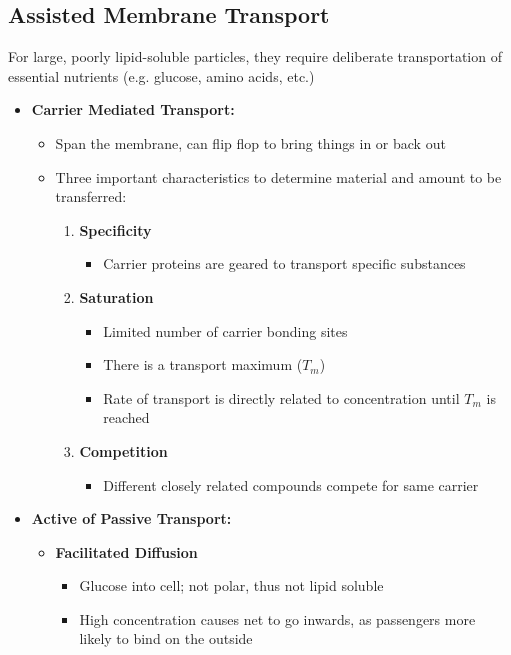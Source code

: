 \documentclass[11pt]{article}
\begin{document}
\subsection{Assisted Membrane Transport}
For large, poorly lipid-soluble particles, they require deliberate transportation of essential nutrients (e.g. glucose, amino acids, etc.)
\begin{itemize}

\item \textbf{Carrier Mediated Transport:}
\begin{itemize}
\item Span the membrane, can flip flop to bring things in or back out 
\item Three important characteristics to determine material and amount to be transferred:
\begin{enumerate}
\item \textbf{Specificity}
\begin{itemize}
\item Carrier proteins are geared to transport specific substances
\end{itemize}
\item \textbf{Saturation}
\begin{itemize}
\item Limited number of carrier bonding sites
\item There is a transport maximum ($T_m$)
\item Rate of transport is directly related to concentration until $T_m$ is reached
\end{itemize}
\item \textbf{Competition}
\begin{itemize}
\item Different closely related compounds compete for same carrier
\end{itemize}
\end{enumerate}
\end{itemize}

\item \textbf{Active of Passive Transport:}
\begin{itemize}

\item \textbf{Facilitated Diffusion}
\begin{itemize}
\item Glucose into cell; not polar, thus not lipid soluble
\item High concentration causes net to go inwards, as passengers more likely to bind on the outside
\end{itemize}


\end{itemize}
\end{itemize}
\end{document}
